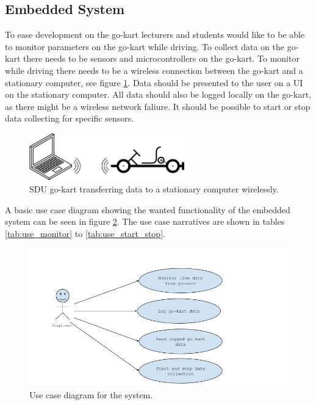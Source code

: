 \subsection{Embedded System}
To ease development on the go-kart lecturers and students would like to be able to monitor parameters on the go-kart while driving.
To collect data on the go-kart there needs to be sensors and microcontrollers on the go-kart.
To monitor while driving there needs to be a wireless connection between the go-kart and a stationary computer, see figure \ref{fig:simple}.
Data should be presented to the user on a UI on the stationary computer.
All data should also be logged locally on the go-kart, as there might be a wireless network faliure. 
It should be possible to start or stop data collecting for specific sensors.
\begin{figure}[h]
 	\centering
    \includegraphics[width=0.6\textwidth]{graphics/go_kart_network_simple}
    \caption{SDU go-kart transferring data to a stationary computer wirelessly.}
    \label{fig:simple}
\end{figure}

A basic use case diagram showing the wanted functionality of the embedded system can be seen in figure \ref{fig:use_cases}.
The use case narratives are shown in tables \ref{tab:use_monitor} to \ref{tab:use_start_stop}.


\begin{figure}[h]
 	\centering
    \includegraphics[width=1\textwidth]{graphics/use_cases.png}
    \caption{Use case diagram for the system.}
    \label{fig:use_cases}
\end{figure}

